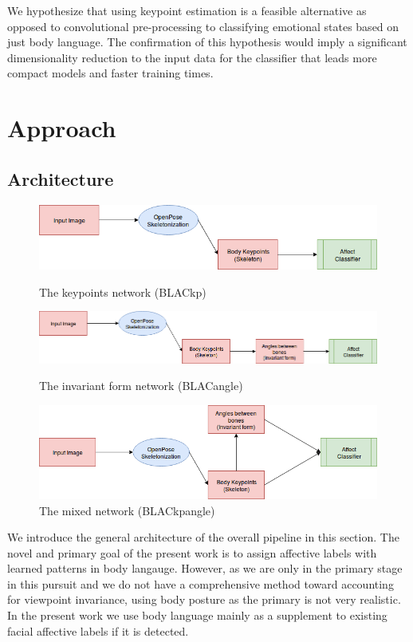 \documentclass{article}
\begin{document}
We hypothesize that using keypoint estimation is a feasible alternative as opposed to convolutional pre-processing to classifying emotional states based on just body language. The confirmation of this hypothesis would imply a significant dimensionality reduction to the input data for the classifier that leads more compact models and faster training times.
\newpage
\section{Approach}


\subsection{Architecture}

\begin{figure}
\centering
\includegraphics[scale=0.3]{kpNetwork}
\caption{The keypoints network (BLACkp)}
\includegraphics[scale=0.3]{angleNetwork}
\caption{The invariant form network (BLACangle)}
\includegraphics[scale=0.4]{mixedNetwork}
\caption{The mixed network (BLACkpangle)}
\end{figure}

We introduce the general architecture of the overall pipeline in this section. The novel and primary goal of the present work is to assign affective labels with learned patterns in body langauge. However, as we are only in the primary stage in this pursuit and we do not have a comprehensive method toward accounting for viewpoint invariance, using body posture as the primary is not very realistic. In the present work we use body language mainly as a supplement to existing facial affective labels if it is detected.
\end{document}
